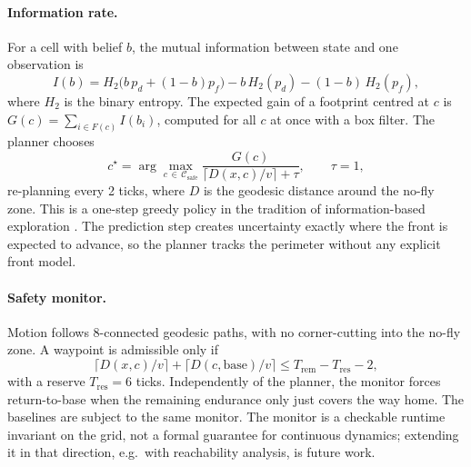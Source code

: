 \documentclass[10pt,a4paper]{article}
\begin{document}
\paragraph{Information rate.} For a cell with belief $b$, the mutual information between state and one observation is
\begin{equation}
I(b) = H_2\big(b\,p_d+(1-b)p_f\big) - b\,H_2(p_d) - (1-b)\,H_2(p_f),
\end{equation}
where $H_2$ is the binary entropy. The expected gain of a footprint centred at $c$ is $G(c)=\sum_{i\in F(c)} I(b_i)$, computed for all $c$ at once with a box filter. The planner chooses
\begin{equation}
c^\star = \arg\max_{c\,\in\,\mathcal C_{\text{safe}}} \frac{G(c)}{\lceil D(x,c)/v\rceil + \tau},\qquad \tau = 1,
\end{equation}
re-planning every 2 ticks, where $D$ is the geodesic distance around the no-fly zone. This is a one-step greedy policy in the tradition of information-based exploration \citep{bourgault2002, hollinger2014}. The prediction step creates uncertainty exactly where the front is expected to advance, so the planner tracks the perimeter without any explicit front model.

\paragraph{Safety monitor.} Motion follows 8-connected geodesic paths, with no corner-cutting into the no-fly zone. A waypoint is admissible only if
\[
\lceil D(x,c)/v\rceil + \lceil D(c,\text{base})/v\rceil \le T_{\text{rem}} - T_{\text{res}} - 2,
\]
with a reserve $T_{\text{res}}=6$ ticks. Independently of the planner, the monitor forces return-to-base when the remaining endurance only just covers the way home. The baselines are subject to the same monitor. The monitor is a checkable runtime invariant on the grid, not a formal guarantee for continuous dynamics; extending it in that direction, e.g.\ with reachability analysis, is future work.
\end{document}
